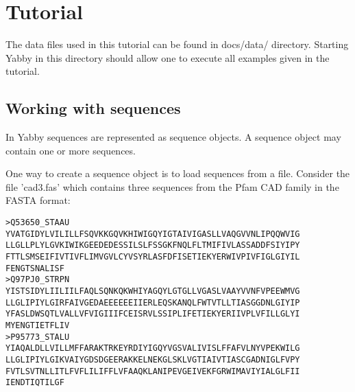 

\setcounter{section}{0}

\chapter{Tutorial}

The data files used in this tutorial can be found in docs/data/ 
directory. Starting Yabby in this directory should allow one to
execute all examples given in the tutorial.

\section{Working with sequences}


In Yabby sequences are represented as sequence objects. A sequence
object may contain one or more sequences. 

One way to create a sequence object is to load sequences from a
file.  Consider the file 'cad3.fas' which contains three sequences
from the Pfam CAD family in the FASTA format:

\begin{verbatim}
>Q53650_STAAU
YVATGIDYLVILILLFSQVKKGQVKHIWIGQYIGTAIVIGASLLVAQGVVNLIPQQWVIG
LLGLLPLYLGVKIWIKGEEDEDESSILSLFSSGKFNQLFLTMIFIVLASSADDFSIYIPY
FTTLSMSEIFIVTIVFLIMVGVLCYVSYRLASFDFISETIEKYERWIVPIVFIGLGIYIL
FENGTSNALISF
>Q97PJ0_STRPN
YISTSIDYLIILIILFAQLSQNKQKWHIYAGQYLGTGLLVGASLVAAYVVNFVPEEWMVG
LLGLIPIYLGIRFAIVGEDAEEEEEEIIERLEQSKANQLFWTVTLLTIASGGDNLGIYIP
YFASLDWSQTLVALLVFVIGIIIFCEISRVLSSIPLIFETIEKYERIIVPLVFILLGLYI
MYENGTIETFLIV
>P95773_STALU
YIAQALDLLVILLMFFARAKTRKEYRDIYIGQYVGSVALIVISLFFAFVLNYVPEKWILG
LLGLIPIYLGIKVAIYGDSDGEERAKKELNEKGLSKLVGTIAIVTIASCGADNIGLFVPY
FVTLSVTNLLITLFVFLILIFFLVFAAQKLANIPEVGEIVEKFGRWIMAVIYIALGLFII
IENDTIQTILGF
\end{verbatim}

